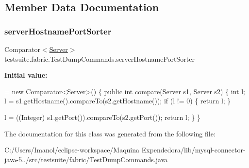 \subsection{Member Data Documentation}
\mbox{\label{classtestsuite_1_1fabric_1_1_test_dump_commands_ab25fd2d22fe2aa920076006b001c2074}} 
\subsubsection{\texorpdfstring{server\+Hostname\+Port\+Sorter}{serverHostnamePortSorter}}
{\footnotesize\ttfamily Comparator$<$\mbox{\hyperlink{classcom_1_1mysql_1_1fabric_1_1_server}{Server}}$>$ testsuite.\+fabric.\+Test\+Dump\+Commands.\+server\+Hostname\+Port\+Sorter\hspace{0.3cm}{\ttfamily [static]}}

{\bfseries Initial value\+:}
\begin{DoxyCode}
= \textcolor{keyword}{new} Comparator<Server>() \{
        \textcolor{keyword}{public} \textcolor{keywordtype}{int} compare(Server s1, Server s2) \{
            \textcolor{keywordtype}{int} l;
            l = s1.getHostname().compareTo(s2.getHostname());
            \textcolor{keywordflow}{if} (l != 0) \{
                \textcolor{keywordflow}{return} l;
            \}

            l = ((Integer) s1.getPort()).compareTo(s2.getPort());
            \textcolor{keywordflow}{return} l;
        \}
    \}
\end{DoxyCode}


The documentation for this class was generated from the following file\+:\begin{DoxyCompactItemize}
\item 
C\+:/\+Users/\+Imanol/eclipse-\/workspace/\+Maquina Expendedora/lib/mysql-\/connector-\/java-\/5../src/testsuite/fabric/Test\+Dump\+Commands.\+java\end{DoxyCompactItemize}
